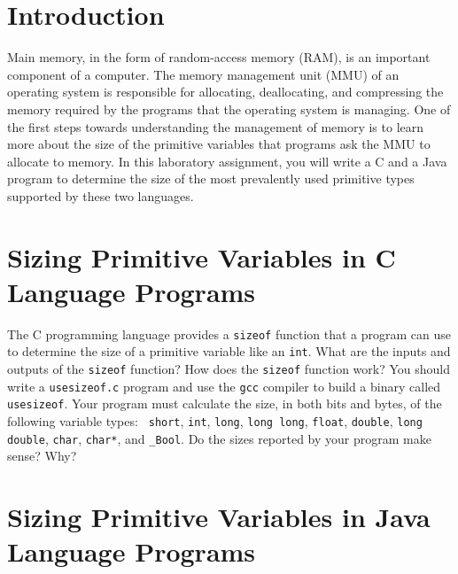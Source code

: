 


\usepackage[compact]{titlesec}



\section*{Introduction}

  Main memory, in the form of random-access memory (RAM), is an important component of a computer.  The memory management
  unit (MMU) of an operating system is responsible for allocating, deallocating, and compressing the memory required by
  the programs that the operating system is managing. One of the first steps towards understanding the management of
  memory is to learn more about the size of the primitive variables that programs ask the MMU to allocate to memory. In
  this laboratory assignment, you will write a C and a Java program to determine the size of the most prevalently used
  primitive types supported by these two languages. 

\section*{Sizing Primitive Variables in C Language Programs}

  The C programming language provides a {\tt sizeof} function that a program can use to determine the size of a primitive
  variable like an {\tt int}. What are the inputs and outputs of the {\tt sizeof} function? How does the {\tt sizeof}
  function work? You should write a {\tt usesizeof.c} program and use the {\tt gcc} compiler to build a binary called
  {\tt usesizeof}. Your program must calculate the size, in both bits and bytes, of the following variable types: {\tt
  short}, {\tt int}, {\tt long}, {\tt long long}, {\tt float}, {\tt double}, {\tt long double}, {\tt char}, {\tt char*},
  and {\tt \_Bool}. Do the sizes reported by your program make sense? Why?

\section*{Sizing Primitive Variables in Java Language Programs}

